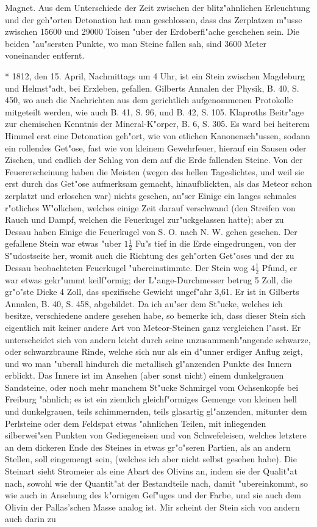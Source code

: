 \documentclass[a4paper, 11pt, oneside, polutonikogreek, german]{article}
\begin{document}
Magnet. Aus dem Unterschiede der Zeit zwischen der blitz"ahnlichen Erleuchtung und der geh"orten Detonation hat man geschlossen, dass das Zerplatzen m"usse zwischen 15600 und 29000 Toisen "uber der Erdoberfl"ache geschehen sein. Die beiden "au"sersten Punkte, wo man Steine fallen sah, sind 3600 Meter voneinander entfernt.

* 1812, den 15. April, Nachmittags um 4 Uhr, ist ein Stein zwischen Magdeburg und Helmst"adt, bei Erxleben, gefallen. Gilberts Annalen der Physik, B. 40, S. 450, wo auch die Nachrichten aus dem gerichtlich aufgenommenen Protokolle mitgeteilt werden, wie auch B. 41, S. 96, und B. 42, S. 105. Klaproths Beitr"age zur chemischen Kenntnis der Mineral-K"orper, B. 6, S. 305. Es ward bei heiterem Himmel erst eine Detonation geh"ort, wie von etlichen Kanonensch"ussen, sodann ein rollendes Get"ose, fast wie von kleinem Gewehrfeuer, hierauf ein Sausen oder Zischen, und endlich der Schlag von dem auf die Erde fallenden Steine. Von der Feuererscheinung haben die Meisten (wegen des hellen Tageslichtes, und weil sie erst durch das Get"ose aufmerksam gemacht, hinaufblickten, als das Meteor schon zerplatzt und erloschen war) nichts gesehen, au"ser Einige ein langes schmales r"otliches W"olkchen, welches einige Zeit darauf verschwand (den Streifen von Rauch und Dampf, welchen die Feuerkugel zur"uckgelassen hatte); aber zu Dessau haben Einige die Feuerkugel von S. O. nach N. W. gehen gesehen. Der gefallene Stein war etwas "uber $\mathfrak{1\frac{1}{2}}$ Fu"s tief in die Erde eingedrungen, von der S"udostseite her, womit auch die Richtung des geh"orten Get"oses und der zu Dessau beobachteten Feuerkugel "ubereinstimmte. Der Stein wog $\mathfrak{4\frac{1}{2}}$ Pfund, er war etwas gekr"ummt keilf"ormig; der L"ange-Durchmesser betrug 5 Zoll, die gr"o"ste Dicke 4 Zoll, das spezifische Gewicht ungef"ahr 3,61. Er ist in Gilberts Annalen, B. 40, S. 458, abgebildet. Da ich au"ser dem St"ucke, welches ich besitze, verschiedene andere gesehen habe, so bemerke ich, dass dieser Stein sich eigentlich mit keiner andere Art von Meteor-Steinen ganz vergleichen l"asst. Er unterscheidet sich von andern leicht durch seine unzusammenh"angende schwarze, oder schwarzbraune Rinde, welche sich nur als ein d"unner erdiger Anflug zeigt, und wo man "uberall hindurch die metallisch gl"anzenden Punkte des Innern erblickt. Das Innere ist im Ansehen (aber sonst nicht) einem dunkelgrauen Sandsteine, oder noch mehr manchem St"ucke Schmirgel vom Ochsenkopfe bei Freiburg "ahnlich; es ist ein ziemlich gleichf"ormiges Gemenge von kleinen hell und dunkelgrauen, teils schimmernden, teils glasartig gl"anzenden, mitunter dem Perlsteine oder dem Feldspat etwas "ahnlichen Teilen, mit inliegenden silberwei"sen Punkten von Gediegeneisen und von Schwefeleisen, welches letztere an dem dickeren Ende des Steines in etwas gr"o"seren Partien, als an andern Stellen, soll eingemengt sein, (welches ich aber nicht selbst gesehen habe). Die Steinart sieht Stromeier als eine Abart des Olivins an, indem sie der Qualit"at nach, sowohl wie der Quantit"at der Bestandteile nach, damit "ubereinkommt, so wie auch in Ansehung des k"ornigen Gef"uges und der Farbe, und sie auch dem Olivin der Pallas'schen Masse analog ist. Mir scheint der Stein sich von andern auch darin zu 
\end{document}

